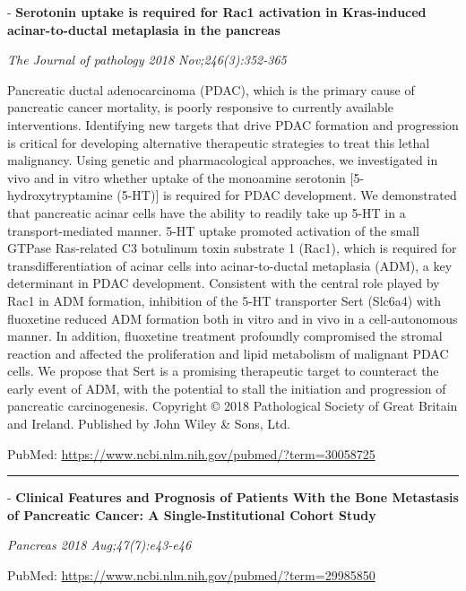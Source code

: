 \documentclass[]{article}
\begin{document}
 - \textbf{Serotonin uptake is required for Rac1 activation in
Kras-induced acinar-to-ductal metaplasia in the pancreas}

\emph{The Journal of pathology 2018 Nov;246(3):352-365}

Pancreatic ductal adenocarcinoma (PDAC), which is the primary cause of
pancreatic cancer mortality, is poorly responsive to currently available
interventions. Identifying new targets that drive PDAC formation and
progression is critical for developing alternative therapeutic
strategies to treat this lethal malignancy. Using genetic and
pharmacological approaches, we investigated in vivo and in vitro whether
uptake of the monoamine serotonin {[}5-hydroxytryptamine (5-HT){]} is
required for PDAC development. We demonstrated that pancreatic acinar
cells have the ability to readily take up 5-HT in a transport-mediated
manner. 5-HT uptake promoted activation of the small GTPase Ras-related
C3 botulinum toxin substrate 1 (Rac1), which is required for
transdifferentiation of acinar cells into acinar-to-ductal metaplasia
(ADM), a key determinant in PDAC development. Consistent with the
central role played by Rac1 in ADM formation, inhibition of the 5-HT
transporter Sert (Slc6a4) with fluoxetine reduced ADM formation both in
vitro and in vivo in a cell-autonomous manner. In addition, fluoxetine
treatment profoundly compromised the stromal reaction and affected the
proliferation and lipid metabolism of malignant PDAC cells. We propose
that Sert is a promising therapeutic target to counteract the early
event of ADM, with the potential to stall the initiation and progression
of pancreatic carcinogenesis. Copyright © 2018 Pathological Society of
Great Britain and Ireland. Published by John Wiley \& Sons, Ltd.

PubMed: \url{https://www.ncbi.nlm.nih.gov/pubmed/?term=30058725}

{}

{}

\begin{center}\rule{0.5\linewidth}{\linethickness}\end{center}

 - \textbf{Clinical Features and Prognosis of Patients With the Bone
Metastasis of Pancreatic Cancer: A Single-Institutional Cohort Study}

\emph{Pancreas 2018 Aug;47(7):e43-e46}

PubMed: \url{https://www.ncbi.nlm.nih.gov/pubmed/?term=29985850}

{}
\end{document}
